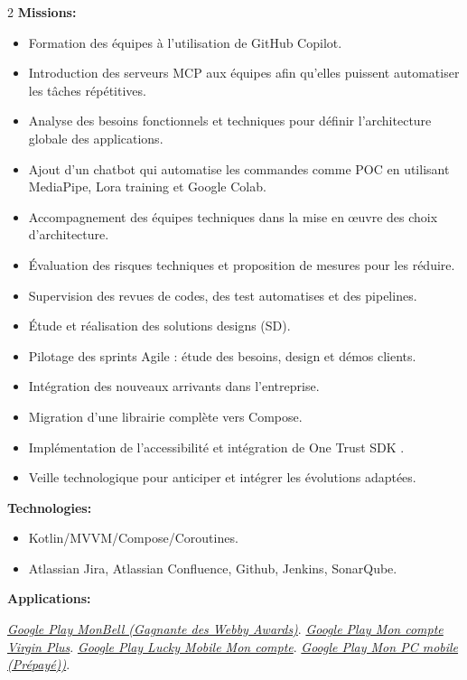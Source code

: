 \documentclass[10pt,a4paper,withhyper]{altacv}
\begin{document}
\begin{paracol}{2}
\textbf{Missions:}
\begin{itemize}
\addtolength{\itemindent}{0.1cm}
\item Formation des équipes à l'utilisation de GitHub Copilot.
\item Introduction des serveurs MCP aux équipes afin qu'elles puissent automatiser les tâches répétitives.
\item Analyse des besoins fonctionnels et techniques pour définir l’architecture
globale des applications.
\item Ajout d'un chatbot qui automatise les commandes comme POC en utilisant MediaPipe, Lora training et Google Colab.
\item Accompagnement des équipes techniques dans la mise en œuvre des choix
d’architecture.
\item Évaluation des risques techniques et proposition de mesures pour les réduire.
\item Supervision des revues de codes, des test automatises et des pipelines.
\item Étude et réalisation des solutions designs (SD).
\item Pilotage des sprints Agile : étude des besoins, design et démos clients.
\item Intégration des nouveaux arrivants dans l’entreprise.
\item Migration d’une librairie complète vers Compose.
\item Implémentation de l’accessibilité et intégration de One Trust SDK .
\item Veille technologique pour anticiper et intégrer les évolutions adaptées.
\end{itemize}

\textbf{Technologies:}

\begin{itemize}
\addtolength{\itemindent}{0.1cm}
\item Kotlin/MVVM/Compose/Coroutines.
\item Atlassian Jira, Atlassian Confluence, Github, Jenkins, SonarQube.

\end{itemize}

\textbf{Applications:}

\href{https://play.google.com/store/apps/details?id=ca.bell.selfserve.mybellmobile&hl=fr&gl=CA&pli=1}{\textit{Google Play MonBell (Gagnante des Webby Awards)}}.
\newline
\href{https://play.google.com/store/apps/details?id=ca.virginmobile.myaccount.virginmobile&hl=fr}{\textit{Google Play Mon compte Virgin Plus}}.
\newline
\href{https://play.google.com/store/apps/details?id=ca.luckymobile&hl=fr}{\textit{Google Play Lucky Mobile Mon compte}}.
\newline
\href{https://play.google.com/store/apps/details?id=ca.pcmobile.selfserve.mypcmobile&hl=fr}{\textit{Google Play Mon PC mobile (Prépayé))}}.


\end{paracol}
\end{document}
